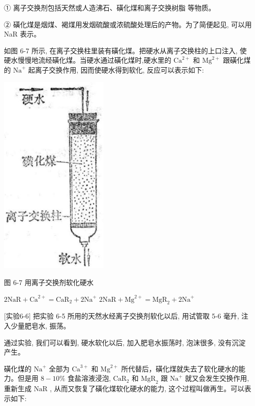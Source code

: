 \documentclass[10pt]{article}
\begin{document}
① 离子交换剂包括天然或人造沸石、磺化煤和离子交换树脂 等物质。

② 磺化煤是烟煤、褐煤用发烟硫酸或浓硫酸处理后的产物。为了简便起见, 可以用 NaR 表示。

如图 6-7 所示, 在离子交换柱里装有磺化煤。把硬水从离子交换柱的上口注入, 使硬水慢慢地流经磺化煤。当硬水通过磺化煤时,硬水里的 \({\mathrm{{Ca}}}^{2 + }\) 和 \({\mathrm{{Mg}}}^{2 + }\) 跟磺化煤的 \({\mathrm{{Na}}}^{ + }\) 起离子交换作用, 因而使硬水得到软化, 反应可以表示如下:

\begin{center}
\includegraphics[max width=0.4\textwidth]{images/01912d13-9986-7822-a012-3f3f7be99dcb_202_585298.jpg}
\end{center}

图 6-7 用离子交换剂软化硬水

\(2\mathrm{{NaR}} + {\mathrm{{Ca}}}^{2 + } = {\mathrm{{CaR}}}_{2} + 2{\mathrm{{Na}}}^{ + }\) \(2\mathrm{{NaR}} + {\mathrm{{Mg}}}^{2 + } = {\mathrm{{MgR}}}_{2} + 2{\mathrm{{Na}}}^{ + }\)

[实验6-6] 把实验 6-5 所用的天然水经离子交换剂软化以后, 用试管取 5-6 毫升, 注入少量肥皂水, 振荡。

通过实验, 我们可以看到, 硬水软化以后, 加入肥皂水振荡时, 泡沫很多, 没有沉淀产生。

磺化煤的 \({\text{Na}}^{ + }\) 全部为 \({\text{Ca}}^{3 + }\) 和 \({\text{Mg}}^{2 + }\) 所代替后，磺化煤就失去了软化硬水的能力。但是用 \(8 - {10}\%\) 食盐溶液浸泡, \({\mathrm{{CaR}}}_{2}\) 和 \({\mathrm{{MgR}}}_{2}\) 跟 \({\mathrm{{Na}}}^{ + }\) 就又会发生交换作用,重新生成 \(\mathrm{{NaR}}\) , 从而又恢复了磺化煤软化硬水的能力, 这个过程叫做再生。可以表示如下:
\end{document}

